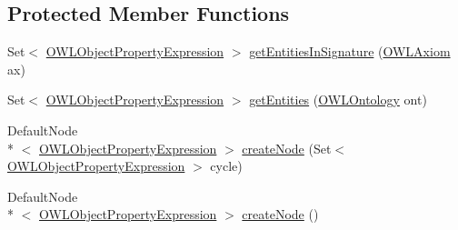 \subsection*{Protected Member Functions}
\begin{DoxyCompactItemize}
\item 
Set$<$ \hyperlink{interfaceorg_1_1semanticweb_1_1owlapi_1_1model_1_1_o_w_l_object_property_expression}{O\-W\-L\-Object\-Property\-Expression} $>$ \hyperlink{classorg_1_1semanticweb_1_1owlapi_1_1reasoner_1_1structural_1_1_structural_reasoner_1_1_object_property_hierarchy_info_a5ce37d03edca76ef03a9072f0d58dbe6}{get\-Entities\-In\-Signature} (\hyperlink{interfaceorg_1_1semanticweb_1_1owlapi_1_1model_1_1_o_w_l_axiom}{O\-W\-L\-Axiom} ax)
\item 
Set$<$ \hyperlink{interfaceorg_1_1semanticweb_1_1owlapi_1_1model_1_1_o_w_l_object_property_expression}{O\-W\-L\-Object\-Property\-Expression} $>$ \hyperlink{classorg_1_1semanticweb_1_1owlapi_1_1reasoner_1_1structural_1_1_structural_reasoner_1_1_object_property_hierarchy_info_a2355e0af2f19a44ab2deff986eab30f3}{get\-Entities} (\hyperlink{interfaceorg_1_1semanticweb_1_1owlapi_1_1model_1_1_o_w_l_ontology}{O\-W\-L\-Ontology} ont)
\item 
Default\-Node\\*
$<$ \hyperlink{interfaceorg_1_1semanticweb_1_1owlapi_1_1model_1_1_o_w_l_object_property_expression}{O\-W\-L\-Object\-Property\-Expression} $>$ \hyperlink{classorg_1_1semanticweb_1_1owlapi_1_1reasoner_1_1structural_1_1_structural_reasoner_1_1_object_property_hierarchy_info_a5ddbd5e68aa19f6d2298baf4dce778c8}{create\-Node} (Set$<$ \hyperlink{interfaceorg_1_1semanticweb_1_1owlapi_1_1model_1_1_o_w_l_object_property_expression}{O\-W\-L\-Object\-Property\-Expression} $>$ cycle)
\item 
Default\-Node\\*
$<$ \hyperlink{interfaceorg_1_1semanticweb_1_1owlapi_1_1model_1_1_o_w_l_object_property_expression}{O\-W\-L\-Object\-Property\-Expression} $>$ \hyperlink{classorg_1_1semanticweb_1_1owlapi_1_1reasoner_1_1structural_1_1_structural_reasoner_1_1_object_property_hierarchy_info_a0880a31ee8403e7036449290ff3dfc3f}{create\-Node} ()
\end{DoxyCompactItemize}


